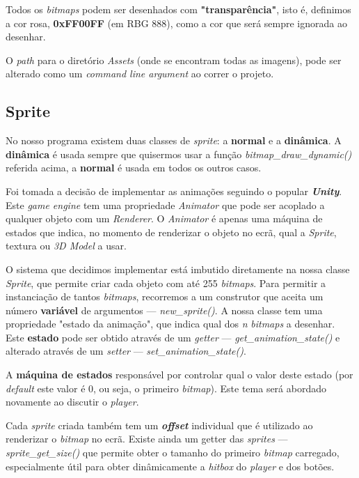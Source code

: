\documentclass{report}
\begin{document}
Todos os \textit{bitmaps} podem ser desenhados com \textbf{"transparência"}, isto é, definimos a cor rosa, \textbf{0xFF00FF} (em RBG 888), como a cor que será sempre ignorada ao desenhar.

O \textit{path} para o diretório \textit{Assets} (onde se encontram todas as imagens), pode ser alterado como um \textit{command line argument} ao correr o projeto.

\subsection{Sprite}

No nosso programa existem duas classes de \textit{sprite}: a \textbf{normal} e a \textbf{dinâmica}. A \textbf{dinâmica} é usada sempre que quisermos usar a função \textit{bitmap\_draw\_dynamic()} referida acima, a \textbf{normal} é usada em todos os outros casos.

Foi tomada a decisão de implementar as animações seguindo o popular \textbf{\textit{Unity}}. Este \textit{game engine} tem uma propriedade \textit{Animator} que pode ser acoplado a qualquer objeto com um \textit{Renderer}. O \textit{Animator} é apenas uma máquina de estados que indica, no momento de renderizar o objeto no ecrã, qual a \textit{Sprite}, textura ou \textit{3D Model} a usar.

O sistema que decidimos implementar está imbutido diretamente na nossa classe \textit{Sprite}, que permite criar cada objeto com até 255 \textit{bitmaps}. Para permitir a instanciação de tantos \textit{bitmaps}, recorremos a um construtor que aceita um número  \textbf{variável} de argumentos --- \textit{new\_sprite()}. A nossa classe tem uma propriedade "estado da animação", que indica qual dos \textit{n} \textit{bitmaps} a desenhar. Este \textbf{estado} pode ser obtido através de um \textit{getter} --- \textit{get\_animation\_state()} e alterado através de um \textit{setter} --- \textit{set\_animation\_state()}.

A \textbf{máquina de estados} responsável por controlar qual o valor deste estado (por \textit{default} este valor é 0, ou seja, o primeiro \textit{bitmap}). Este tema será abordado novamente ao discutir o \textit{player}.

Cada \textit{sprite} criada também tem um \textbf{\textit{offset}} individual que é utilizado ao renderizar o \textit{bitmap} no ecrã. Existe ainda um getter das \textit{sprites} --- \textit{sprite\_get\_size()} que permite obter o tamanho do primeiro \textit{bitmap} carregado, especialmente útil para obter dinâmicamente a \textit{hitbox} do \textit{player} e dos botões.
\end{document}
